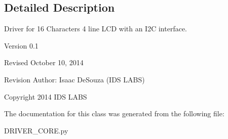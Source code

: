 \subsection{Detailed Description}
\begin{DoxyVerb}Driver for 16 Characters 4 line LCD with an I2C interface.

Version 0.1

Revised October 10, 2014

Revision Author: Isaac DeSouza (IDS LABS)

Copyright 2014 IDS LABS
\end{DoxyVerb}
 

The documentation for this class was generated from the following file\+:\begin{DoxyCompactItemize}
\item 
D\+R\+I\+V\+E\+R\+\_\+\+C\+O\+R\+E.\+py\end{DoxyCompactItemize}
